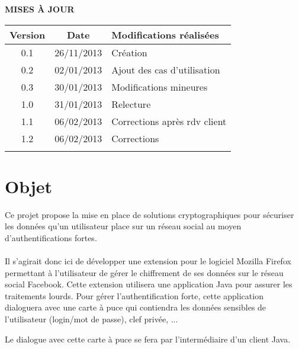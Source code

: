 \documentclass[a4paper,11pt,french]{article}
\begin{document}
\makeFirstPage
\clearpage

\vspace*{1cm}
\begin{center}
\textbf{\huge{MISES À JOUR}}\\
\vspace*{3cm}
	\begin{tabularx}{16cm}{|c|c|X|}
	\hline
	\bfseries{Version} & \bfseries{Date} & \bfseries{Modifications réalisées}\\
	\hline
	0.1 & 26/11/2013 & Création\\
	\hline
    0.2 & 02/01/2013 & Ajout des cas d'utilisation\\
	\hline
    0.3 & 30/01/2013 & Modifications mineures\\
	\hline
    1.0 & 31/01/2013 & Relecture \\
	\hline
    1.1 & 06/02/2013 & Corrections après rdv client \\
	\hline
    1.2 & 06/02/2013 & Corrections \\
	\hline
	&&\\
	\hline
	\end{tabularx}
\end{center}

\clearpage
\tableofcontents
\clearpage

\section{Objet}
\renewcommand\labelitemi{\textbullet} %
\renewcommand\labelitemii{$\circ$} %
Ce projet propose la mise en place de solutions cryptographiques pour 
sécuriser les données qu’un utilisateur place sur un réseau social au moyen 
d’authentifications fortes.

\paragraph{}
Il s’agirait donc ici de développer une extension pour le logiciel Mozilla 
Firefox permettant à l’utilisateur de gérer le chiffrement de ses données sur 
le réseau social Facebook. Cette extension utilisera
une application Java pour assurer les traitements lourds. Pour gérer 
l’authentification forte, cette application dialoguera avec une carte à puce 
qui contiendra les données sensibles de l’utilisateur (login/mot de passe), 
clef privée, ...

Le dialogue avec cette carte à puce se fera par l’intermédiaire d’un 
client Java. 
\end{document}
